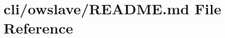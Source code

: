 \hypertarget{cli_2owslave_2README_8md}{\section{cli/owslave/\-R\-E\-A\-D\-M\-E.md File Reference}
\label{cli_2owslave_2README_8md}
}
